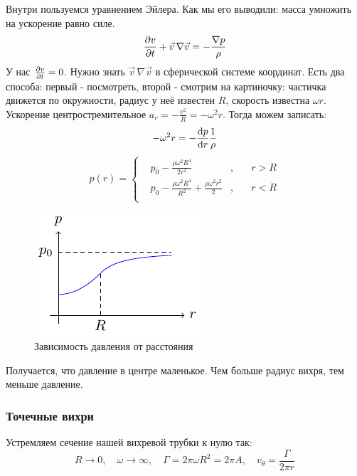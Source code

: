 Внутри пользуемся уравнением Эйлера. Как мы его выводили: масса умножить на ускорение равно силе.
\begin{equation}
	\pdv{v}{t}+\vec{v}\,\nabla\vec{v}=-\frac{\nabla p}{\rho}
\end{equation}
У нас $\pdv{v}{t}=0$. Нужно знать $\vec{v}\,\nabla\vec{v}$ в сферической системе координат. Есть два способа: первый - посмотреть, второй - смотрим на картиночку: частичка движется по окружности, радиус у неё известен $R$, скорость известна $\omega r$. Ускорение центростремительное $a_r=-\frac{v^2}{R}=-\omega^2 r$. Тогда можем записать:
\begin{equation}
	-\omega^2 r  = - \dv{p}{r}\frac{1}{\rho}
\end{equation}
\begin{equation}
	p(r)=\left\{
	\begin{aligned}
		&p_0-\frac{\rho\omega^2 R^4}{2r^2}&, \quad& r>R\\
		&p_0-\frac{\rho\omega^2 R^4}{R^2}+\frac{\rho\omega^2 r^2}{2}&, \quad& r<R\\
	\end{aligned}
	\right.
\end{equation}
\begin{figure}[H]
    \centering
    \includegraphics[scale=1.5]{img/pr}
    \caption{Зависимость давления от расстояния}
    \label{fig:figure1}
\end{figure}
Получается, что давление в центре маленькое. Чем больше радиус вихря, тем меньше давление.




\subsubsection{Точечные вихри}

Устремляем сечение нашей вихревой трубки к нулю так:
\begin{equation}
	R\to0, \quad \omega\to\infty, \quad 
	\Gamma=2\pi \omega R^2 =2\pi A, 
	\quad v_\theta=\frac{\Gamma}{2\pi r}
\end{equation}

